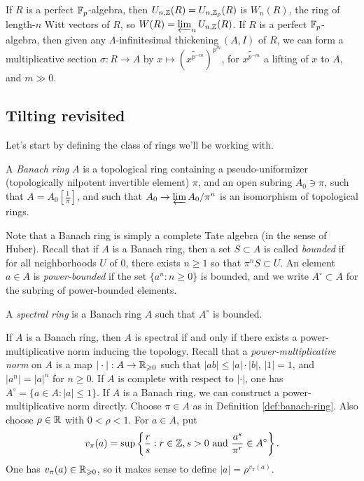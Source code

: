 If $R$ is a perfect $\mathbb{F}_p$-algebra, then $U_{n,\mathbb{Z}}(R)=U_{n,\mathbb{Z}_p}(R)$ is 
$W_n(R)$, the ring of length-$n$ Witt vectors of $R$, so 
$W(R) = \varprojlim_n U_{n,\mathbb{Z}}(R)$. If $R$ is a perfect $\mathbb{F}_p$-algebra, then 
given any $\Lambda$-infinitesimal thickening $(A,I)$ of $R$, we can form a 
multiplicative section $\sigma:R\to A$ by 
$x\mapsto (\widetilde{x^{p^{-m}}})^{p^m}$, for $\widetilde{x^{p^{-m}}}$ a lifting 
of $x$ to $A$, and $m\gg 0$. 





\subsection{Tilting revisited}

Let's start by defining the class of rings we'll be working with. 

\begin{definition}\label{def:banach-ring}
A \emph{Banach ring} $A$ is a topological ring containing a pseudo-uniformizer 
(topologically nilpotent invertible element) $\pi$, and an open subring 
$A_0\ni \pi$, such that 
$A = A_0[\frac 1 \pi]$, and such that $A_0 \to \varprojlim A_0/\pi^n$ is an 
isomorphism of topological rings.  
\end{definition}

Note that a Banach ring is simply a complete Tate algebra (in the sense of 
Huber). Recall that if $A$ is a Banach ring, then a set $S\subset A$ is called 
\emph{bounded} if for all neighborhoods $U$ of $0$, there exists 
$n\geqslant 1$ so that $\pi^n S\subset U$. An element $a\in A$ is 
\emph{power-bounded} if the set $\{a^n:n\geqslant 0\}$ is bounded, and we 
write $A^\circ\subset A$ for the subring of power-bounded elements. 

\begin{definition}
A \emph{spectral ring} is a Banach ring $A$ such that $A^\circ$ is bounded. 
\end{definition}

If $A$ is a Banach ring, then $A$ is spectral if and only if there exists a 
power-multiplicative norm inducing the topology. Recall that a 
\emph{power-multiplicative norm} on $A$ is a map 
$|\cdot|:A\to \mathbb{R}_{\geqslant 0}$ such that $|a b|\leqslant |a|\cdot |b|$, 
$|1|=1$, and $|a^n|=|a|^n$ for $n\geqslant 0$. If $A$ is complete with 
respect to $|\cdot|$, one has $A^\circ = \{a\in A:|a|\leqslant 1\}$. If $A$ is 
a Banach ring, we can construct a power-multiplicative norm directly. Choose 
$\pi\in A$ as in Definition \ref{def:banach-ring}. Also choose $\rho\in \mathbb{R}$ 
with $0<\rho<1$. For $a\in A$, put 
\[
  v_\pi(a) = \sup\left\{\frac r s :  r\in \mathbb{Z},s>0\text{ and }\frac{a^s}{\pi^r}\in A^\circ\right\} .
\]
One has $v_\pi(a)\in \mathbb{R}_{\geqslant 0}$, so it makes sense to define 
$|a| = \rho^{v_\pi(a)}$. 

